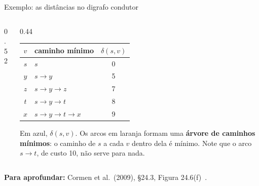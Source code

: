 \documentclass[aspectratio=169,xcolor=table]{beamer}
\newcommand{\arcoscond}{s/t/10/r, s/y/5/r, t/x/1/r, t/y/2/bl, y/t/3/bl, y/x/9/r,
  y/z/2/r, x/z/4/bl, z/x/6/bl, z/s/7/cz}
\newcommand{\digrafo}[7]{%
  \node[vert] (s) at (0,0) {s};      \node[vert] (t) at (1.6,0.9) {t};
  \node[vert] (x) at (3.4,0.9) {x};  \node[vert] (y) at (1.6,-0.9) {y};
  \node[vert] (z) at (3.4,-0.9) {z};
  \def\lista{#2}\ifx\lista\empty\else
    \foreach \v in {#2} \node[vdentro] at (\v) {\v};\fi
  \foreach \u/\v/\w/\o in \arcoscond \draw[arco, \o] (\u) to (\v);
  \edef\lista{#1}\ifx\lista\empty\else
    \foreach \u/\v/\o in \lista \draw[arcoarv, \o] (\u) to (\v);\fi
  \foreach \u/\v/\w/\o in \arcoscond \path[\o] (\u) to node[peso] {\w} (\v);
  \def\lista{#3}\ifx\lista\empty\else \node[dlab, left=0.5mm of s] {#3};\fi
  \def\lista{#4}\ifx\lista\empty\else \node[dlab, above=0.5mm of t] {#4};\fi
  \def\lista{#5}\ifx\lista\empty\else \node[dlab, above=0.5mm of x] {#5};\fi
  \def\lista{#6}\ifx\lista\empty\else \node[dlab, below left=0mm and 0.2mm of y] {#6};\fi
  \def\lista{#7}\ifx\lista\empty\else \node[dlab, right=0.5mm of z] {#7};\fi
}
\newcommand{\arvorefinal}{s/y/r, y/t/bl, t/x/r, y/z/r}
\newcommand{\fonte}[1]{%
  \vfill
  {\tiny\color{gray!55!black}\textbf{Para aprofundar:} #1\par}%
}
\begin{document}
\begin{frame}{Exemplo: as distâncias no digrafo condutor}
  \begin{columns}[c]
    \begin{column}{0.52\textwidth}
      \begin{center}
      \end{center}
    \end{column}
    \begin{column}{0.44\textwidth}
      \centering\scriptsize
      \begin{tabular}{clc}
        \toprule
        $v$ & caminho mínimo & $\delta(s,v)$ \\
        \midrule
        $s$ & $s$ & 0 \\
        $y$ & $s \to y$ & 5 \\
        $z$ & $s \to y \to z$ & 7 \\
        $t$ & $s \to y \to t$ & 8 \\
        $x$ & $s \to y \to t \to x$ & 9 \\
        \bottomrule
      \end{tabular}
      \medskip

      \raggedright
      Em azul, $\delta(s,v)$. Os arcos em laranja formam uma \textbf{árvore de caminhos
      mínimos}: o caminho de $s$ a cada $v$ dentro dela é mínimo. Note que o arco
      $s \to t$, de custo 10, não serve para nada.
    \end{column}
  \end{columns}
  \fonte{Cormen et al.\ (2009), \S 24.3, Figura 24.6(f)~\cite{cormen2009introduction}.}
\end{frame}
\end{document}
